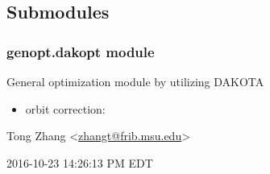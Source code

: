 \documentclass[letterpaper,10pt,english]{sphinxmanual}
\begin{document}
\subsection{Submodules}
\label{src/apidocs/genopt:submodules}

\subsubsection{genopt.dakopt module}
\label{src/apidocs/dakopt:module-genopt.dakopt}\label{src/apidocs/dakopt:genopt-dakopt-module}\label{src/apidocs/dakopt::doc}
General optimization module by utilizing DAKOTA
\begin{itemize}
\item {} 
orbit correction: 

\end{itemize}

Tong Zhang \textless{}\href{mailto:zhangt@frib.msu.edu}{zhangt@frib.msu.edu}\textgreater{}

2016-10-23 14:26:13 PM EDT
\end{document}
